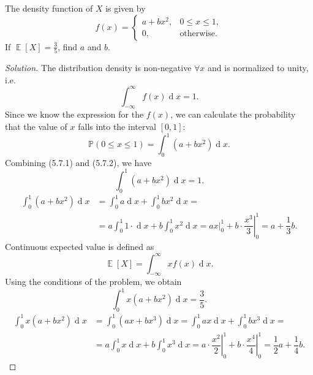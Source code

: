 \documentclass{article}[12pt]
\newenvironment{solution}
  {\renewcommand\qedsymbol{$\blacksquare$}\begin{proof}[Solution]}
  {\end{proof}}
\newenvironment{problem}[1]
  {\renewcommand\theinnercustomprblm{#1}\innercustomprblm}
  {\endinnercustomprblm}
\DeclareMathOperator{\dif}{d}
\DeclareMathOperator{\E}{\mathbb{E}}
\renewcommand{\P}{\mathbb{P}}
\begin{document}
\begin{problem}{5.7}\normalfont
The density function of $X$ is given by
\begin{equation*}
    f(x) =
    \begin{cases}
    a + bx^{2},& 0 \leqslant x \leqslant 1,
    \\
    0, &\text{otherwise.}
    \end{cases}
\end{equation*}
If $\E[X] = \tfrac{3}{5}$, find $a$ and $b$.
\end{problem}
\begin{solution}
The distribution density is non-negative $\forall x$ and is normalized to unity, i.e.
\begin{equation*}
    \int_{-\infty}^{\infty}f(x)\dif x = 1.\tag{5.7.1}
\end{equation*}
Since we know the expression for the $f(x)$, we can calculate the probability that the value of $x$ falls into the interval $[0, 1]$:
\begin{equation*}
    \P(0\leqslant x\leqslant 1) = \int_{0}^{1}\left(a + bx^{2}\right)\dif x.\tag{5.7.2}
\end{equation*}
Combining (5.7.1) and (5.7.2), we have
\begin{equation*}
    \int_{0}^{1}\left(a + bx^{2}\right)\dif x = 1.
\end{equation*}
\begin{align*}
    \int_{0}^{1}\left(a + bx^{2}\right)\dif x &= \int_{0}^{1}a\dif x + \int_{0}^{1}bx^{2}\dif x =
    \\
    &= a\int_{0}^{1}1\cdot\dif x + b\int_{0}^{1}x^{2}\dif x = ax|_{0}^{1} + b\cdot\left.\dfrac{x^{3}}{3}\right|_{0}^{1} =  a + \dfrac{1}{3}b.\tag{5.7.3}
\end{align*}
Continuous expected value is defined as
\begin{equation*}
    \E[X] = \int_{-\infty}^{\infty}xf(x)\dif x.
\end{equation*}
Using the conditions of the problem, we obtain
\begin{equation*}
    \int_{0}^{1}x(a + bx^{2})\dif x = \dfrac{3}{5}.
\end{equation*}
\begin{align*}
    \int_{0}^{1}x(a + bx^{2})\dif x &=\int_{0}^{1}(ax + bx^{3})\dif x =\int_{0}^{1}ax\dif x + \int_{0}^{1}bx^{3}\dif x =
    \\
    &= a\int_{0}^{1}x\dif x + b\int_{0}^{1}x^{3}\dif x = a\cdot\left.\dfrac{x^{2}}{2}\right|_{0}^{1} + b\cdot\left.\dfrac{x^{4}}{4}\right|_{0}^{1} = \dfrac{1}{2}a + \dfrac{1}{4}b.\tag{5.7.4}

\end{align*}
\end{solution}
\end{document}
